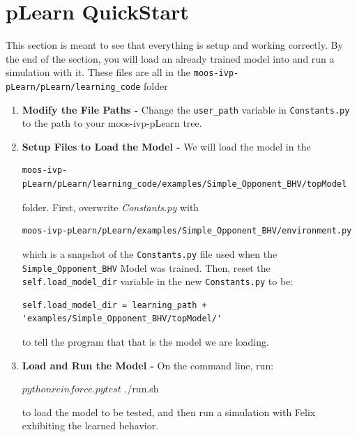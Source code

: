 \documentclass[onecolumn,letterpaper,11pt]{article}
\begin{document}
\section{pLearn QuickStart}
This section is meant to see that everything is setup and working correctly. By the end of the section, you will load an already trained model into  and run a simulation with it. These files are all in the \texttt{moos-ivp-pLearn/pLearn/learning\_code} 
folder 
\begin{enumerate}
	\item \textbf{Modify the File Paths -} Change the \texttt{user\_path} variable in \texttt{Constants.py} to the path to your moos-ivp-pLearn tree.  
	
	\item \textbf{Setup Files to Load the Model -} We will load the model in the
	
	\begin{verbatim} 
moos-ivp-pLearn/pLearn/learning_code/examples/Simple_Opponent_BHV/topModel
	\end{verbatim}
	
	folder. First, overwrite \textit{Constants.py} with
	
	\begin{verbatim} 
moos-ivp-pLearn/pLearn/examples/Simple_Opponent_BHV/environment.py
	\end{verbatim}

	\vspace{0.15in}
	 which is a snapshot of the \texttt{Constants.py} file used when the \texttt{Simple\_Opponent\_BHV} Model was trained. Then, reset the \texttt{self.load\_model\_dir} variable in the new \texttt{Constants.py} to be: 
	 
	 \begin{verbatim} 
self.load_model_dir = learning_path + 'examples/Simple_Opponent_BHV/topModel/'
	 \end{verbatim}
 
	to tell the program that that is the model we are loading. 
	
	\item \textbf{Load and Run the Model -} On the command line, run:
	
	\vspace{0.15in}
	\begin{fileverb} 
$ python reinforce.py test
$ ./run.sh 
	\end{fileverb}
	\vspace{0.15in}
	
	to load the model to be tested, and then run a simulation with Felix exhibiting the learned behavior.
\end{enumerate} 
\end{document}
